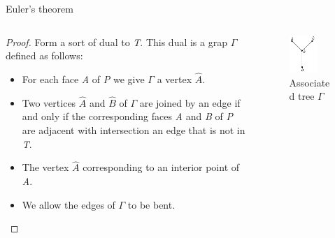 \documentclass{beamer}
\begin{document}
\begin{frame}{Euler's theorem}
  \begin{columns}
    \begin{column}{0.6\textwidth}
      \begin{proof}
        Form a sort of dual to \textsl{T}. This dual is a grap $\Gamma$ defined as follows:
        \begin{itemize}
        \item For each face \textsl{A} of \textsl{P} we give $\Gamma$ a vertex $\hat A$.
        \item Two vertices $\hat A$ and $\hat B$ of $\Gamma$ are joined by an edge if and only if the corresponding faces \textsl{A} and \textsl{B} of \textsl{P} are adjacent with intersection an edge that is not in \textsl{T}.
        \item The vertex $\hat A$ corresponding to an interior point of \textsl{A}.
        \item We allow the edges of $\Gamma$ to be bent.
        \end{itemize}
      \end{proof}
    \end{column}
    \begin{column}{0.4\textwidth}
      \begin{figure}
        \centering
        \includegraphics[width=0.7\textwidth]{figure_1_5_b.png}
        \caption{Associated tree $\Gamma$}
      \end{figure}
    \end{column}
  \end{columns}
\end{frame}
\end{document}
